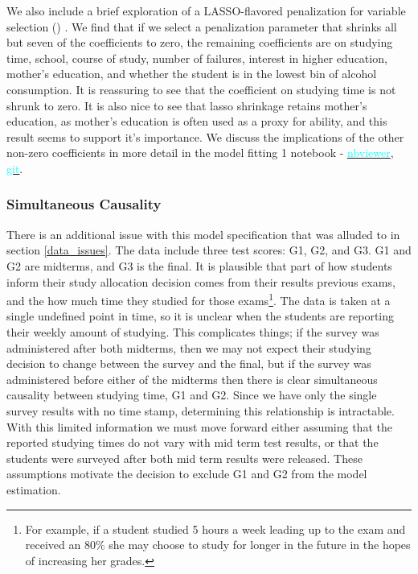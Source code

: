 \documentclass[12pt]{article}
\begin{document}
We also include a brief exploration of a LASSO-flavored penalization for variable selection (\cite{MLmetrics}) . We find that if we select a penalization parameter that shrinks all but seven of the coefficients to zero, the remaining coefficients are on studying time, school, course of study, number of failures, interest in higher education, mother's education, and whether the student is in the lowest bin of alcohol consumption. It is reassuring to see that the coefficient on studying time is not shrunk to zero. It is also nice to see that lasso shrinkage retains mother's education, as mother's education is often used as a proxy for ability, and this result seems to support it's importance. We discuss the implications of the other non-zero coefficients in more detail in the model fitting 1 notebook - \href{https://nbviewer.jupyter.org/github/nadavtadelis/Reproducible_Metrics/blob/master/model_fitting_1.ipynb}{\textcolor{cyan}{nbviewer}}, \href{https://github.com/nadavtadelis/Reproducible_Metrics/blob/master/model_fitting_1.ipynb}{\textcolor{cyan}{git}}.

\subsubsection{Simultaneous Causality} \label{simul_caus}
There is an additional issue with this model specification that was alluded to in section \ref{data_issues}. The data include three test scores: G1, G2, and G3. G1 and G2 are midterms, and G3 is the final. It is plausible that part of how students inform their study allocation decision comes from their results previous exams, and the how much time they studied for those exams\footnote{For example, if a student studied 5 hours a week leading up to the exam and received an 80\% she may choose to study for longer in the future in the hopes of increasing her grades.}. The data is taken at a single undefined point in time, so it is unclear when the students are reporting their weekly amount of studying. This complicates things; if the survey was administered after both midterms, then we may not expect their studying decision to change between the survey and the final, but if the survey was administered before either of the midterms then there is clear simultaneous causality between studying time, G1 and G2. Since we have only the single survey results with no time stamp, determining this relationship is intractable. With this limited information we must move forward either assuming that the reported studying times do not vary with mid term test results, or that the students were surveyed after both mid term results were released. These assumptions motivate the decision to exclude G1 and G2 from the model estimation.
\end{document}
